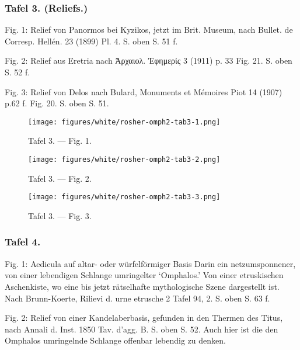 \documentclass[a4paper, 11pt, oneside]{article}
\begin{document}
\subsubsection{Tafel 3. (Reliefs.)}

Fig. 1: Relief von Panormos bei Kyzikos, jetzt im Brit. Museum, nach Bullet. de Corresp. Hellén. 23 (1899) Pl. 4. S. oben S. 51 f.

Fig. 2: Relief aus Eretria nach Ἀρχαιολ. Ἐφημερίς 3 (1911) p. 33 Fig. 21. S. oben S. 52 f.

Fig. 3: Relief von Delos nach Bulard, Monuments et Mémoires Piot 14 (1907) p.62 f. Fig. 20. S. oben S. 51.
\clearpage
\begin{landscape}
\vspace*{\fill}
\begin{figure}[H]
\centering
\texttt{[image: figures/white/rosher-omph2-tab3-1.png]}
\caption{Tafel 3. --- Fig. 1.}
\end{figure}
\vspace*{\fill}
\clearpage
\vspace*{\fill}
\begin{figure}[H]
\centering
\texttt{[image: figures/white/rosher-omph2-tab3-2.png]}
\caption{Tafel 3. --- Fig. 2.}
\end{figure}
\vspace*{\fill}
\clearpage
\vspace*{\fill}
\begin{figure}[H]
\centering
\texttt{[image: figures/white/rosher-omph2-tab3-3.png]}
\caption{Tafel 3. --- Fig. 3.}
\end{figure}
\vspace*{\fill}
\clearpage
\end{landscape}
\subsubsection{Tafel 4.}

Fig. 1: Aedicula auf altar- oder würfelförmiger Basis Darin ein netzumsponnener, von einer lebendigen Schlange umringelter `Omphalos.' Von einer etruskischen Aschenkiste, wo eine bis jetzt rätselhafte mythologische Szene dargestellt ist. Nach Brunn-Koerte, Rilievi d. urne etrusche 2 Tafel 94, 2. S. oben S. 63 f.

Fig. 2: Relief von einer Kandelaberbasis, gefunden in den Thermen des Titus, nach Annali d. Inst. 1850 Tav. d'agg. B. S. oben S. 52. Auch hier ist die den Omphalos umringelnde Schlange offenbar lebendig zu denken.
\end{document}
